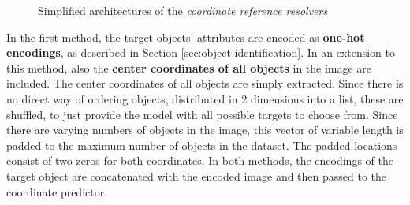 \begin{figure}[ht]
    \centering
    \caption{Simplified architectures of the \emph{coordinate reference resolvers}}
\end{figure}

In the first method, the target objects' attributes are encoded as \textbf{one-hot encodings}, as described in Section \ref{sec:object-identification}.
In an extension to this method, also the \textbf{center coordinates of all objects} in the image are included.
The center coordinates of all objects are simply extracted.
Since there is no direct way of ordering objects, distributed in 2 dimensions into a list, these are shuffled, to just provide the model with all possible targets to choose from.
Since there are varying numbers of objects in the image, this vector of variable length is padded to the maximum number of objects in the dataset.
The padded locations consist of two zeros for both coordinates.
In both methods, the encodings of the target object are concatenated with the encoded image and then passed to the coordinate predictor.

